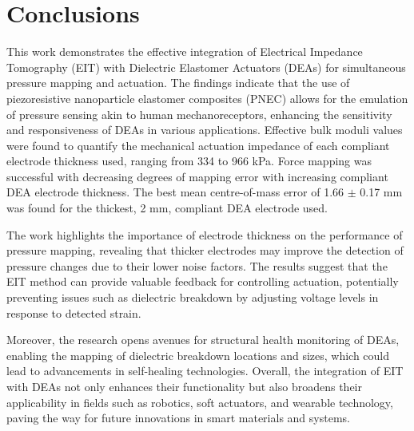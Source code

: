 \section{Conclusions}
This work demonstrates the effective integration of Electrical Impedance Tomography (EIT) with Dielectric Elastomer Actuators (DEAs) for simultaneous pressure mapping and actuation. The findings indicate that the use of piezoresistive nanoparticle elastomer composites (PNEC) allows for the emulation of pressure sensing akin to human mechanoreceptors, enhancing the sensitivity and responsiveness of DEAs in various applications. Effective bulk moduli values were found to quantify the mechanical actuation impedance of each compliant electrode thickness used, ranging from 334 to 966 kPa. Force mapping was successful with decreasing degrees of mapping error with increasing compliant DEA electrode thickness. The best mean centre-of-mass error of 1.66 $\pm$ 0.17 mm was found for the thickest, 2 mm, compliant DEA electrode used.

The work highlights the importance of electrode thickness on the performance of pressure mapping, revealing that thicker electrodes may improve the detection of pressure changes due to their lower noise factors. The results suggest that the EIT method can provide valuable feedback for controlling actuation, potentially preventing issues such as dielectric breakdown by adjusting voltage levels in response to detected strain.

Moreover, the research opens avenues for structural health monitoring of DEAs, enabling the mapping of dielectric breakdown locations and sizes, which could lead to advancements in self-healing technologies. Overall, the integration of EIT with DEAs not only enhances their functionality but also broadens their applicability in fields such as robotics, soft actuators, and wearable technology, paving the way for future innovations in smart materials and systems. 

